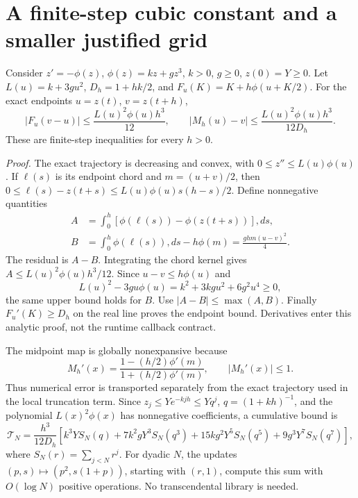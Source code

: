 \documentclass[aps,pra,reprint,onecolumn,11pt,notitlepage,nofootinbib]{revtex4-2}
\begin{document}
\section{A finite-step cubic constant and a smaller justified grid}
Consider $z'=-\phi(z)$, $\phi(z)=kz+gz^3$, $k>0$, $g\ge0$, $z(0)=Y\ge0$.
Let $L(u)=k+3gu^2$, $D_h=1+hk/2$, and
$F_u(K)=K+h\phi(u+K/2)$. For the exact endpoints $u=z(t)$, $v=z(t+h)$,
\begin{equation}
 |F_u(v-u)|\le\frac{L(u)^2\phi(u)h^3}{12},\qquad
 |M_h(u)-v|\le\frac{L(u)^2\phi(u)h^3}{12D_h}.
 \label{eq:cubic}
\end{equation}
These are finite-step inequalities for every $h>0$.

\textit{Proof.} The exact trajectory is decreasing and convex, with
$0\le z''\le L(u)\phi(u)$. If $\ell(s)$ is its endpoint chord and
$m=(u+v)/2$, then
$0\le\ell(s)-z(t+s)\le L(u)\phi(u)s(h-s)/2$.
Define nonnegative quantities
\begin{align}
 A&=\int_0^h[\phi(\ell(s))-\phi(z(t+s))],ds,\\
 B&=\int_0^h\phi(\ell(s)),ds-h\phi(m)
   =\frac{ghm(u-v)^2}{4}.
\end{align}
The residual is $A-B$. Integrating the chord kernel gives
$A\le L(u)^2\phi(u)h^3/12$. Since $u-v\le h\phi(u)$ and
\begin{equation}
 L(u)^2-3gu\phi(u)=k^2+3kgu^2+6g^2u^4\ge0,
\end{equation}
the same upper bound holds for $B$. Use $|A-B|\le\max(A,B)$.
Finally $F_u'(K)\ge D_h$ on the real line proves the endpoint bound.
Derivatives enter this analytic proof, not the runtime callback contract.

The midpoint map is globally nonexpansive because
\begin{equation}
 M_h'(x)=\frac{1-(h/2)\phi'(m)}{1+(h/2)\phi'(m)},\qquad |M_h'(x)|\le1.
\end{equation}
Thus numerical error is transported separately from the exact trajectory
used in the local truncation term. Since
$z_j\le Ye^{-kjh}\le Yq^j$, $q=(1+kh)^{-1}$, and the polynomial
$L(x)^2\phi(x)$ has nonnegative coefficients, a cumulative bound is
\begin{equation}
 \mathcal T_N=\frac{h^3}{12D_h}\left[
 k^3Y S_N(q)+7k^2gY^3S_N(q^3)
 +15kg^2Y^5S_N(q^5)+9g^3Y^7S_N(q^7)\right],
 \label{eq:sum}
\end{equation}
where $S_N(r)=\sum_{j<N}r^j$. For dyadic $N$, the updates
$(p,s)\mapsto(p^2,s(1+p))$, starting with $(r,1)$, compute this sum with
$O(\log N)$ positive operations. No transcendental library is needed.
\end{document}
